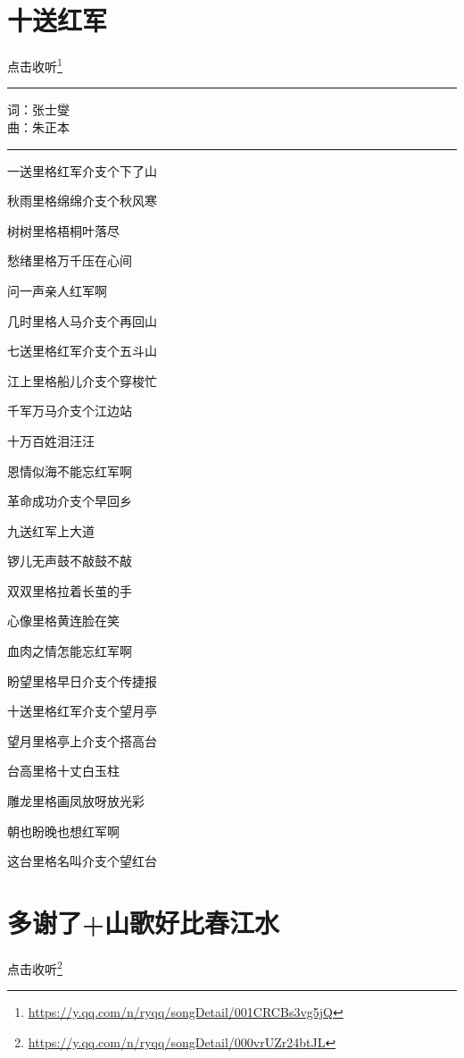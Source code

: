 \documentclass[]{ctexbook}
\renewcommand{\href}[2]{#2\footnote{\url{#1}}}
\begin{document}
\section*{十送红军}\label{Seeing-off-the-Red-Amy}


\href{https://y.qq.com/n/ryqq/songDetail/001CRCBs3vg5jQ}{点击收听}

\begin{center}\rule{0.5\linewidth}{0.5pt}\end{center}

词：张士燮\\
曲：朱正本

\begin{center}\rule{0.5\linewidth}{0.5pt}\end{center}

一送里格红军介支个下了山

秋雨里格绵绵介支个秋风寒

树树里格梧桐叶落尽

愁绪里格万千压在心间

问一声亲人红军啊

几时里格人马介支个再回山

七送里格红军介支个五斗山

江上里格船儿介支个穿梭忙

千军万马介支个江边站

十万百姓泪汪汪

恩情似海不能忘红军啊

革命成功介支个早回乡

九送红军上大道

锣儿无声鼓不敲鼓不敲

双双里格拉着长茧的手

心像里格黄连脸在笑

血肉之情怎能忘红军啊

盼望里格早日介支个传捷报

十送里格红军介支个望月亭

望月里格亭上介支个搭高台

台高里格十丈白玉柱

雕龙里格画凤放呀放光彩

朝也盼晚也想红军啊

这台里格名叫介支个望红台

\section*{多谢了+山歌好比春江水}\label{folk-songs-like-spring-river}


\href{https://y.qq.com/n/ryqq/songDetail/000vrUZr24btJL}{点击收听}
\end{document}
